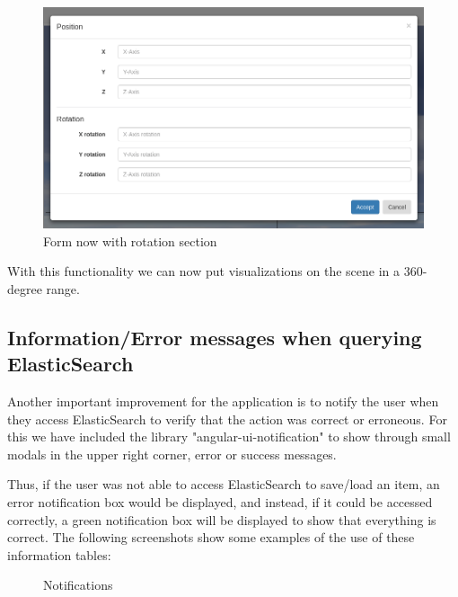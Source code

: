 \documentclass[a4paper, 12pt]{book}
\begin{document}
\begin{figure}[H]
  \centering
  \includegraphics[width=16cm, keepaspectratio]{img/development/newformaframedc}
  \caption{Form now with rotation section}
  \label{fig:examplestandalone}
\end{figure}

With this functionality we can now put visualizations on the scene in a 360-degree range.

\subsection{Information/Error messages when querying ElasticSearch}

Another important improvement for the application is to notify the user when they access ElasticSearch to verify that the action was correct or erroneous. For this we have included the library "angular-ui-notification" to show through small modals in the upper right corner, error or success messages.

Thus, if the user was not able to access ElasticSearch to save/load an item, an error notification box would be displayed, and instead, if it could be accessed correctly, a green notification box will be displayed to show that everything is correct. The following screenshots show some examples of the use of these information tables:

\begin{figure}[H]
 \centering
 \caption{Notifications}
 \label{f:threedcexamples}
\end{figure}
\end{document}

